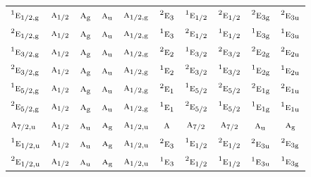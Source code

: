 \documentclass[10pt,a4paper]{article}
\numberwithin{equation}{section}
\newcommand{\irr}[1]{\text{\normalfont\scshape #1}}
\newcommand{\conjpair}[1]{{}^{#1}}
\newcommand{\ptag}[1]{\mathrm{#1}}
\begin{document}
{\begin{longtable}{@{}lccccccccc@{}}
$\conjpair{1}\irr{e}_{1/2,\ptag{g}}$ & $\irr{a}_{1/2}$ & $\irr{a}_{\ptag{g}}$ & $\irr{a}_{\ptag{u}}$ & $\irr{a}_{1/2,\ptag{g}}$ & $\conjpair{2}\irr{e}_{3}$ & $\conjpair{1}\irr{e}_{1/2}$ & $\conjpair{2}\irr{e}_{1/2}$ & $\conjpair{2}\irr{e}_{3\ptag{g}}$ & $\conjpair{2}\irr{e}_{3\ptag{u}}$\\
$\conjpair{2}\irr{e}_{1/2,\ptag{g}}$ & $\irr{a}_{1/2}$ & $\irr{a}_{\ptag{g}}$ & $\irr{a}_{\ptag{u}}$ & $\irr{a}_{1/2,\ptag{g}}$ & $\conjpair{1}\irr{e}_{3}$ & $\conjpair{2}\irr{e}_{1/2}$ & $\conjpair{1}\irr{e}_{1/2}$ & $\conjpair{1}\irr{e}_{3\ptag{g}}$ & $\conjpair{1}\irr{e}_{3\ptag{u}}$\\
$\conjpair{1}\irr{e}_{3/2,\ptag{g}}$ & $\irr{a}_{1/2}$ & $\irr{a}_{\ptag{g}}$ & $\irr{a}_{\ptag{u}}$ & $\irr{a}_{1/2,\ptag{g}}$ & $\conjpair{2}\irr{e}_{2}$ & $\conjpair{1}\irr{e}_{3/2}$ & $\conjpair{2}\irr{e}_{3/2}$ & $\conjpair{2}\irr{e}_{2\ptag{g}}$ & $\conjpair{2}\irr{e}_{2\ptag{u}}$\\
$\conjpair{2}\irr{e}_{3/2,\ptag{g}}$ & $\irr{a}_{1/2}$ & $\irr{a}_{\ptag{g}}$ & $\irr{a}_{\ptag{u}}$ & $\irr{a}_{1/2,\ptag{g}}$ & $\conjpair{1}\irr{e}_{2}$ & $\conjpair{2}\irr{e}_{3/2}$ & $\conjpair{1}\irr{e}_{3/2}$ & $\conjpair{1}\irr{e}_{2\ptag{g}}$ & $\conjpair{1}\irr{e}_{2\ptag{u}}$\\
$\conjpair{1}\irr{e}_{5/2,\ptag{g}}$ & $\irr{a}_{1/2}$ & $\irr{a}_{\ptag{g}}$ & $\irr{a}_{\ptag{u}}$ & $\irr{a}_{1/2,\ptag{g}}$ & $\conjpair{2}\irr{e}_{1}$ & $\conjpair{1}\irr{e}_{5/2}$ & $\conjpair{2}\irr{e}_{5/2}$ & $\conjpair{2}\irr{e}_{1\ptag{g}}$ & $\conjpair{2}\irr{e}_{1\ptag{u}}$\\
$\conjpair{2}\irr{e}_{5/2,\ptag{g}}$ & $\irr{a}_{1/2}$ & $\irr{a}_{\ptag{g}}$ & $\irr{a}_{\ptag{u}}$ & $\irr{a}_{1/2,\ptag{g}}$ & $\conjpair{1}\irr{e}_{1}$ & $\conjpair{2}\irr{e}_{5/2}$ & $\conjpair{1}\irr{e}_{5/2}$ & $\conjpair{1}\irr{e}_{1\ptag{g}}$ & $\conjpair{1}\irr{e}_{1\ptag{u}}$\\
$\irr{a}_{7/2,\ptag{u}}$ & $\irr{a}_{1/2}$ & $\irr{a}_{\ptag{u}}$ & $\irr{a}_{\ptag{g}}$ & $\irr{a}_{1/2,\ptag{u}}$ & $\irr{a}$ & $\irr{a}_{7/2}$ & $\irr{a}_{7/2}$ & $\irr{a}_{\ptag{u}}$ & $\irr{a}_{\ptag{g}}$\\
$\conjpair{1}\irr{e}_{1/2,\ptag{u}}$ & $\irr{a}_{1/2}$ & $\irr{a}_{\ptag{u}}$ & $\irr{a}_{\ptag{g}}$ & $\irr{a}_{1/2,\ptag{u}}$ & $\conjpair{2}\irr{e}_{3}$ & $\conjpair{1}\irr{e}_{1/2}$ & $\conjpair{2}\irr{e}_{1/2}$ & $\conjpair{2}\irr{e}_{3\ptag{u}}$ & $\conjpair{2}\irr{e}_{3\ptag{g}}$\\
$\conjpair{2}\irr{e}_{1/2,\ptag{u}}$ & $\irr{a}_{1/2}$ & $\irr{a}_{\ptag{u}}$ & $\irr{a}_{\ptag{g}}$ & $\irr{a}_{1/2,\ptag{u}}$ & $\conjpair{1}\irr{e}_{3}$ & $\conjpair{2}\irr{e}_{1/2}$ & $\conjpair{1}\irr{e}_{1/2}$ & $\conjpair{1}\irr{e}_{3\ptag{u}}$ & $\conjpair{1}\irr{e}_{3\ptag{g}}$\\

\end{longtable}}
\end{document}
